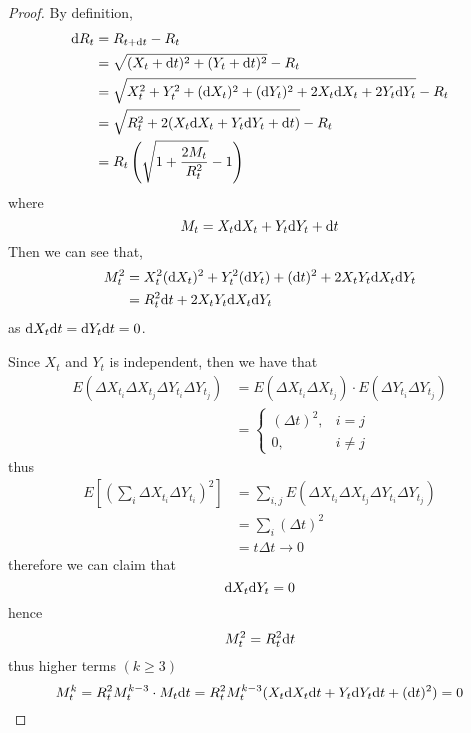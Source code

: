 \documentclass{homework}
\begin{document}
    \problem
    \begin{proof}
        By definition,
        \[\begin{aligned}
            \mathrm d R_t&=R_{t+\mathrm d t}-R_t\\
            &=\sqrt{(X_t+\mathrm d t)^2+(Y_t+\mathrm d t)^2}-R_t\\
            &=\sqrt{X_t^2+Y_t^2+(\mathrm d X_t)^2+(\mathrm d Y_t)^2
            +2X_t\mathrm d X_t+2Y_t\mathrm d Y_t}-R_t\\
            &=\sqrt{R_t^2+2(X_t\mathrm d X_t+Y_t\mathrm d Y_t+\mathrm d t)}-R_t\\
            &=R_t\left(\sqrt{1+\frac{2M_t}{R_t^2}}-1\right)
        \end{aligned}\]
        where
        \[M_t=X_t\mathrm d X_t+Y_t\mathrm d Y_t+\mathrm d t\]
        Then we can see that,
        \[\begin{aligned}
            M_t^2&=X_t^2(\mathrm d X_t)^2+Y_t^2(\mathrm d Y_t)+(\mathrm d t)^2
            +2X_tY_t\mathrm d X_t\mathrm d Y_t\\
            &=R_t^2\mathrm d t+2X_tY_t\mathrm d X_t\mathrm d Y_t
        \end{aligned}\]
        as $\mathrm d X_t\mathrm d t=\mathrm d Y_t\mathrm d t=0$.

        Since $X_t$ and $Y_t$ is independent, then we have that
        \[\begin{aligned}
            E\left(\Delta X_{t_i}\Delta X_{t_j}
                   \Delta Y_{t_i}\Delta Y_{t_j}\right)
            &=E\left(\Delta X_{t_i}\Delta X_{t_j}\right)\cdot
              E\left(\Delta Y_{t_i}\Delta Y_{t_j}\right)\\
            &=\begin{cases}
                (\Delta t)^2,&i=j\\
                0,&i\neq j
            \end{cases}
        \end{aligned}\]
        thus
        \[\begin{aligned}
            E\left[\left(\sum_i\Delta X_{t_i}\Delta Y_{t_i}\right)^2\right]
            &=\sum_{i,j}
            E\left(\Delta X_{t_i}\Delta X_{t_j}
                   \Delta Y_{t_i}\Delta Y_{t_j}\right)\\
            &=\sum_{i}(\Delta t)^2\\
            &=t\Delta t\to 0
        \end{aligned}\]
        therefore we can claim that
        \[\mathrm d X_t\mathrm d Y_t=0\]
        hence
        \begin{equation}
            \label{eq:magic equation}
            M_t^2=R_t^2\mathrm d t
        \end{equation}
        thus higher terms $(k\geq 3)$
        \[M_t^k=R_t^2M_t^{k-3}\cdot M_t\mathrm d t
        =R_t^2M_t^{k-3}(X_t\mathrm d X_t\mathrm d t+Y_t\mathrm d Y_t\mathrm d t+(\mathrm d t)^2)
        =0\]


\end{proof}
\end{document}
